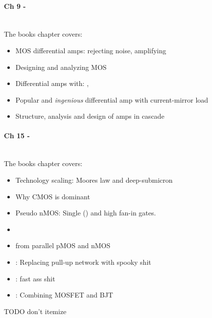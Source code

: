\paragraph{Ch 9 - } \hfill \\
The books chapter covers:
\begin{itemize}
  \item MOS differential amps: rejecting  noise,
        amplifying 
  \item Designing and analyzing MOS 
  \item Differential amps with: , 
  \item Popular and \emph{ingenious} differential amp with current-mirror load
  \item Structure, analysis and design of  amps in cascade
\end{itemize}

\paragraph{Ch 15 - } \hfill \\
The books chapter covers:
\begin{itemize}
  \item Technology scaling: Moores law and deep-submicron
  \item Why CMOS is dominant
  \item Pseudo nMOS: Single  
        () and high fan-in gates.
  \item {}
  \item {} from parallel pMOS and nMOS
  \item {}: Replacing pull-up network with spooky shit
  \item {}: fast ass shit
  \item {}: Combining MOSFET and BJT
\end{itemize}

TODO don't itemize
